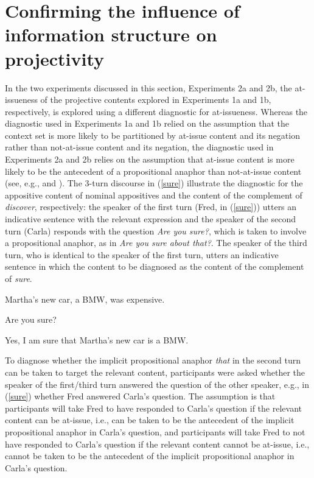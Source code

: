 \documentclass[11pt,fleqn]{article}
\newcommand{\6}{\mbox{$[\hspace*{-.6mm}[$}}
\newcommand{\9}{\mbox{$]\hspace*{-.6mm}]$}}
\begin{document}
\newpage

\section{Confirming the influence of information structure on projectivity}\label{s4}

In the two experiments discussed in this section, Experiments 2a and 2b, the at-issueness of the projective contents explored in Experiments 1a and 1b, respectively, is explored using a different diagnostic for at-issueness. Whereas the diagnostic used in Experiments 1a and 1b relied on the assumption that the context set is more likely to be partitioned by at-issue content and its negation rather than not-at-issue content and its negation, the diagnostic used in Experiments 2a and 2b relies on the assumption that at-issue content is more likely to be the antecedent of a propositional anaphor than not-at-issue content (see, e.g., \citealt[54]{potts05} and \citealt{tonhauser-sula6}). The 3-turn discourse in (\ref{sure}) illustrate the diagnostic for the appositive content of nominal appositives and the content of the complement of {\em discover}, respectively: the speaker of the first turn (Fred, in (\ref{sure})) utters an indicative sentence with the relevant expression and the speaker of the second turn (Carla) responds with the question {\em Are you sure?}, which is taken to involve a propositional anaphor, as in {\em Are you sure about that?}. The speaker of the third turn, who is identical to the speaker of the first turn, utters an indicative sentence in which the content to be diagnosed as the content of the complement of {\em sure}. 


\begin{exe}
\ex\label{sure} 
\begin{xlist}
 Martha’s new car, a BMW, was expensive.

 Are you sure?

 Yes, I am sure that Martha's new car is a BMW.
\end{xlist}

%
%
%
\end{exe}
To diagnose whether the implicit propositional anaphor {\em that} in the second turn can be taken to target the relevant content, participants were asked whether the speaker of the first/third turn answered the question of the other speaker, e.g., in (\ref{sure}) whether Fred answered Carla's question. The assumption is that participants will take Fred to have responded to Carla's question if the relevant content can be at-issue, i.e., can be taken to be the antecedent of the implicit propositional anaphor in Carla's question, and participants will take Fred to not have responded to Carla's question if the relevant content cannot be at-issue, i.e., cannot be taken to be the antecedent of the implicit propositional anaphor in  Carla's question.
\end{document}
